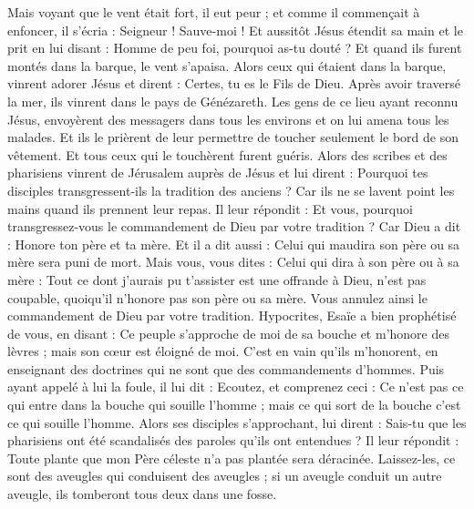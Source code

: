 \begin{multicols}{2}
Mais voyant que le vent était fort, il eut peur ; et comme il commençait à enfoncer, il s'écria : Seigneur ! Sauve-moi !
Et aussitôt Jésus étendit sa main et le prit en lui disant : Homme de peu foi, pourquoi as-tu douté ?
Et quand ils furent montés dans la barque, le vent s'apaisa.
Alors ceux qui étaient dans la barque, vinrent adorer Jésus et dirent : Certes, tu es le Fils de Dieu.
Après avoir traversé la mer, ils vinrent dans le pays de Génézareth.
Les gens de ce lieu ayant reconnu Jésus, envoyèrent des messagers dans tous les environs et on lui amena tous les malades.
Et ils le prièrent de leur permettre de toucher seulement le bord de son vêtement. Et tous ceux qui le touchèrent furent guéris.
\VerseOne{}Alors des scribes et des pharisiens vinrent de Jérusalem auprès de Jésus et lui dirent :
Pourquoi tes disciples transgressent-ils la tradition des anciens ? Car ils ne se lavent point les mains quand ils prennent leur repas.
Il leur répondit : Et vous, pourquoi transgressez-vous le commandement de Dieu par votre tradition ?
Car Dieu a dit : Honore ton père et ta mère. Et il a dit aussi : Celui qui maudira son père ou sa mère sera puni de mort.
Mais vous, vous dites : Celui qui dira à son père ou à sa mère : Tout ce dont j’aurais pu t’assister est une offrande à Dieu, n’est pas coupable, quoiqu’il n’honore pas son père ou sa mère.
Vous annulez ainsi le commandement de Dieu par votre tradition.
Hypocrites, Esaïe a bien prophétisé de vous, en disant :
Ce peuple s’approche de moi de sa bouche et m’honore des lèvres ; mais son cœur est éloigné de moi.
C’est en vain qu’ils m'honorent, en enseignant des doctrines qui ne sont que des commandements d'hommes{}.
Puis ayant appelé à lui la foule, il lui dit : Ecoutez, et comprenez ceci :
Ce n'est pas ce qui entre dans la bouche qui souille l'homme ; mais ce qui sort de la bouche c'est ce qui souille l'homme.
Alors ses disciples s'approchant, lui dirent : Sais-tu que les pharisiens ont été scandalisés des paroles qu’ils ont entendues ?
Il leur répondit : Toute plante que mon Père céleste n'a pas plantée sera déracinée.
Laissez-les, ce sont des aveugles qui conduisent des aveugles ; si un aveugle conduit un autre aveugle, ils tomberont tous deux dans une fosse.

\end{multicols}
